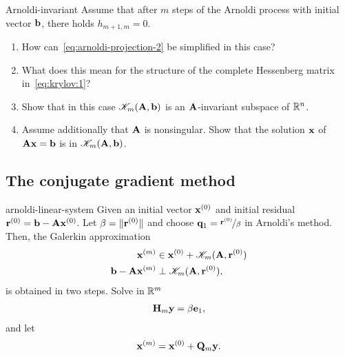 \begin{Problem}{Arnoldi-invariant}
  Assume that after $m$ steps of the Arnoldi process with initial
  vector $\mathbf b$, there holds $h_{m+1,m} = 0$.
  \begin{enumerate}
  \item How can~\eqref{eq:arnoldi-projection-2} be simplified in this
    case?
  \item What does this mean for the structure of the complete
    Hessenberg matrix in~\eqref{eq:krylov:1}?
  \item Show that in this case $\mathscr K_m(\mathbf A,\mathbf b)$ is an
    $\mathbf A$-invariant subspace of $\mathbb R^n$.
  \item Assume additionally that $\mathbf A$ is nonsingular. Show that the
    solution $\mathbf x$ of $\mathbf A\mathbf x = \mathbf b$ is in $\mathscr K_m(\mathbf A,\mathbf b)$.
  \end{enumerate}
\end{Problem}

\subsection{The conjugate gradient method}

\begin{intro}
  
\end{intro}

\begin{Theorem}{arnoldi-linear-system}
  Given an initial vector $\mathbf x^{(0)}$ and initial residual
  $\mathbf r^{(0)} = \mathbf b - \mathbf A \mathbf x^{(0)}$. Let $\beta=\lVert\mathbf r^{(0)}\rVert$
  and choose $\mathbf q_1 =\nicefrac{\mathbf r^{(0)}}{\beta}$ in Arnoldi's
  method. Then, the Galerkin approximation
  \begin{align}
    \mathbf x^{(m)} &\in \mathbf x^{(0)} + \mathscr K_m(\mathbf A,\mathbf r^{(0)})\\
    \mathbf b-\mathbf A \mathbf x^{(m)} &\perp \mathscr K_m(\mathbf A,\mathbf r^{(0)}),
  \end{align}
  is obtained in two steps. Solve in $\mathbb R^m$
  \begin{gather}
    \mathbf H_m\mathbf y = \beta\mathbf e_1,
  \end{gather}
  and let
  \begin{gather}
    \mathbf x^{(m)} = \mathbf x^{(0)} + \mathbf Q_m \mathbf y.
  \end{gather}
\end{Theorem}

